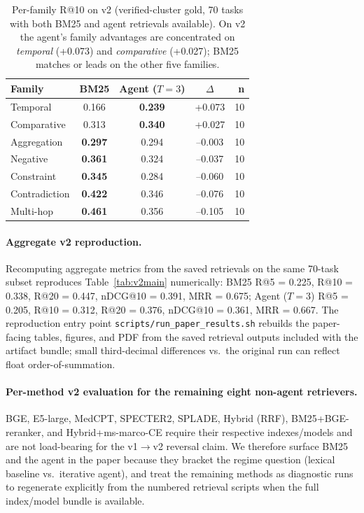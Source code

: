 \documentclass{article}
\begin{document}
\begin{table}[h]
\centering
\caption{Per-family R@10 on v2 (verified-cluster gold, 70 tasks with both BM25 and agent retrievals available). On v2 the agent's family advantages are concentrated on \emph{temporal} (+0.073) and \emph{comparative} (+0.027); BM25 matches or leads on the other five families.}
\label{tab:v2family}
\small
\begin{tabular}{lcccr}
\toprule
\textbf{Family} & \textbf{BM25} & \textbf{Agent ($T{=}3$)} & \textbf{$\Delta$} & \textbf{n} \\
\midrule
Temporal       & 0.166 & \textbf{0.239} & +0.073 & 10 \\
Comparative    & 0.313 & \textbf{0.340} & +0.027 & 10 \\
Aggregation    & \textbf{0.297} & 0.294 & --0.003 & 10 \\
Negative       & \textbf{0.361} & 0.324 & --0.037 & 10 \\
Constraint     & \textbf{0.345} & 0.284 & --0.060 & 10 \\
Contradiction  & \textbf{0.422} & 0.346 & --0.076 & 10 \\
Multi-hop      & \textbf{0.461} & 0.356 & --0.105 & 10 \\
\bottomrule
\end{tabular}
\end{table}

\paragraph{Aggregate v2 reproduction.} Recomputing aggregate metrics from the saved retrievals on the same 70-task subset reproduces Table~\ref{tab:v2main} numerically: BM25 R@5 = 0.225, R@10 = 0.338, R@20 = 0.447, nDCG@10 = 0.391, MRR = 0.675; Agent ($T{=}3$) R@5 = 0.205, R@10 = 0.312, R@20 = 0.376, nDCG@10 = 0.361, MRR = 0.667. The reproduction entry point \texttt{scripts/run\_paper\_results.sh} rebuilds the paper-facing tables, figures, and PDF from the saved retrieval outputs included with the artifact bundle; small third-decimal differences vs.\ the original run can reflect float order-of-summation.

\paragraph{Per-method v2 evaluation for the remaining eight non-agent retrievers.} BGE, E5-large, MedCPT, SPECTER2, SPLADE, Hybrid (RRF), BM25+BGE-reranker, and Hybrid+ms-marco-CE require their respective indexes/models and are not load-bearing for the v1$\to$v2 reversal claim. We therefore surface BM25 and the agent in the paper because they bracket the regime question (lexical baseline vs.\ iterative agent), and treat the remaining methods as diagnostic runs to regenerate explicitly from the numbered retrieval scripts when the full index/model bundle is available.
\end{document}
